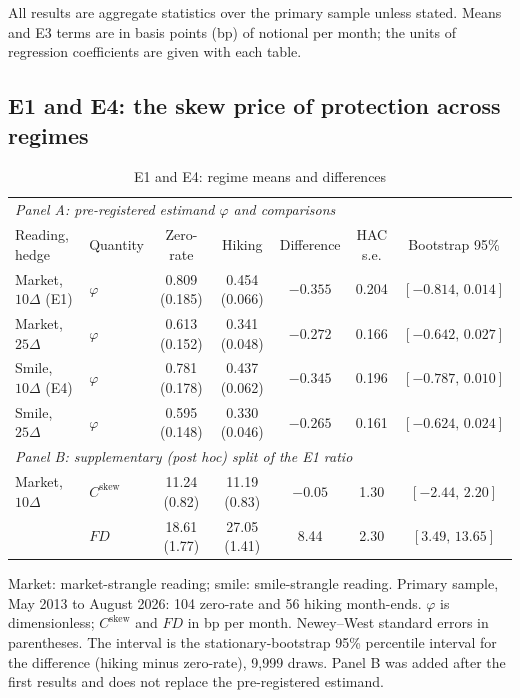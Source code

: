 \documentclass[11pt]{article}
\theoremstyle{result}
\newcommand{\FD}{\mathit{FD}}
\newcommand{\Cskew}{C^{\mathrm{skew}}}
\newcommand{\D}{\Delta}
\begin{document}
All results are aggregate statistics over the primary sample unless stated. Means and E3 terms are in basis points (bp) of notional per month; the units of regression coefficients are given with each table.

\subsection{E1 and E4: the skew price of protection across regimes}\label{sec:e1}

\begin{table}[t]
\centering\footnotesize
\setlength{\tabcolsep}{4pt}
\caption{E1 and E4: regime means and differences}\label{tab:e1}
\begin{tabular}{llccccc}
\toprule
\multicolumn{7}{l}{\emph{Panel A: pre-registered estimand $\varphi$ and comparisons}}\\
Reading, hedge & Quantity & Zero-rate & Hiking & Difference & HAC s.e. & Bootstrap 95\% \\
\midrule
Market, $10\D$ (E1) & $\varphi$ & 0.809 (0.185) & 0.454 (0.066) & $-0.355$ & 0.204 & $[-0.814,\,0.014]$ \\
Market, $25\D$ & $\varphi$ & 0.613 (0.152) & 0.341 (0.048) & $-0.272$ & 0.166 & $[-0.642,\,0.027]$ \\
Smile, $10\D$ (E4) & $\varphi$ & 0.781 (0.178) & 0.437 (0.062) & $-0.345$ & 0.196 & $[-0.787,\,0.010]$ \\
Smile, $25\D$ & $\varphi$ & 0.595 (0.148) & 0.330 (0.046) & $-0.265$ & 0.161 & $[-0.624,\,0.024]$ \\
\midrule
\multicolumn{7}{l}{\emph{Panel B: supplementary (post hoc) split of the E1 ratio}}\\
Market, $10\D$ & $\Cskew$ & 11.24 (0.82) & 11.19 (0.83) & $-0.05$ & 1.30 & $[-2.44,\,2.20]$ \\
 & $\FD$ & 18.61 (1.77) & 27.05 (1.41) & 8.44 & 2.30 & $[3.49,\,13.65]$ \\
\bottomrule
\end{tabular}
\par\medskip
\begin{minipage}{0.97\linewidth}\footnotesize
Market: market-strangle reading; smile: smile-strangle reading. Primary sample, May 2013 to August 2026: 104 zero-rate and 56 hiking month-ends. $\varphi$ is dimensionless; $\Cskew$ and $\FD$ in bp per month. Newey--West standard errors in parentheses. The interval is the stationary-bootstrap 95\% percentile interval for the difference (hiking minus zero-rate), 9,999 draws. Panel B was added after the first results and does not replace the pre-registered estimand.
\end{minipage}
\end{table}
\end{document}
